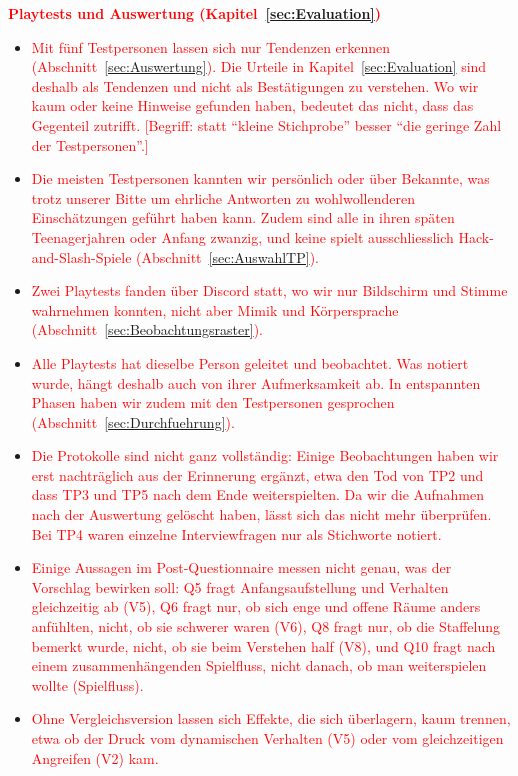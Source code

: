\documentclass[../Main.tex]{subfiles}
\begin{document}
\textcolor{red}{\textbf{Playtests und Auswertung (Kapitel~\ref{sec:Evaluation})}}
\begin{itemize}[leftmargin=1.5cm]
    \item \textcolor{red}{Mit fünf Testpersonen lassen sich nur Tendenzen erkennen (Abschnitt~\ref{sec:Auswertung}). Die Urteile in Kapitel~\ref{sec:Evaluation} sind deshalb als Tendenzen und nicht als Bestätigungen zu verstehen. Wo wir kaum oder keine Hinweise gefunden haben, bedeutet das nicht, dass das Gegenteil zutrifft. [Begriff: statt \enquote{kleine Stichprobe} besser \enquote{die geringe Zahl der Testpersonen}.]}
    \item \textcolor{red}{Die meisten Testpersonen kannten wir persönlich oder über Bekannte, was trotz unserer Bitte um ehrliche Antworten zu wohlwollenderen Einschätzungen geführt haben kann. Zudem sind alle in ihren späten Teenagerjahren oder Anfang zwanzig, und keine spielt ausschliesslich Hack-and-Slash-Spiele (Abschnitt~\ref{sec:AuswahlTP}).}
    \item \textcolor{red}{Zwei Playtests fanden über Discord statt, wo wir nur Bildschirm und Stimme wahrnehmen konnten, nicht aber Mimik und Körpersprache (Abschnitt~\ref{sec:Beobachtungsraster}).}
    \item \textcolor{red}{Alle Playtests hat dieselbe Person geleitet und beobachtet. Was notiert wurde, hängt deshalb auch von ihrer Aufmerksamkeit ab. In entspannten Phasen haben wir zudem mit den Testpersonen gesprochen (Abschnitt~\ref{sec:Durchfuehrung}).}
    \item \textcolor{red}{Die Protokolle sind nicht ganz vollständig: Einige Beobachtungen haben wir erst nachträglich aus der Erinnerung ergänzt, etwa den Tod von TP2 und dass TP3 und TP5 nach dem Ende weiterspielten. Da wir die Aufnahmen nach der Auswertung gelöscht haben, lässt sich das nicht mehr überprüfen. Bei TP4 waren einzelne Interviewfragen nur als Stichworte notiert.}
    \item \textcolor{red}{Einige Aussagen im Post-Questionnaire messen nicht genau, was der Vorschlag bewirken soll: Q5 fragt Anfangsaufstellung und Verhalten gleichzeitig ab (V5), Q6 fragt nur, ob sich enge und offene Räume anders anfühlten, nicht, ob sie schwerer waren (V6), Q8 fragt nur, ob die Staffelung bemerkt wurde, nicht, ob sie beim Verstehen half (V8), und Q10 fragt nach einem zusammenhängenden Spielfluss, nicht danach, ob man weiterspielen wollte (Spielfluss).}
    \item \textcolor{red}{Ohne Vergleichsversion lassen sich Effekte, die sich überlagern, kaum trennen, etwa ob der Druck vom dynamischen Verhalten (V5) oder vom gleichzeitigen Angreifen (V2) kam.}
\end{itemize}
\end{document}
